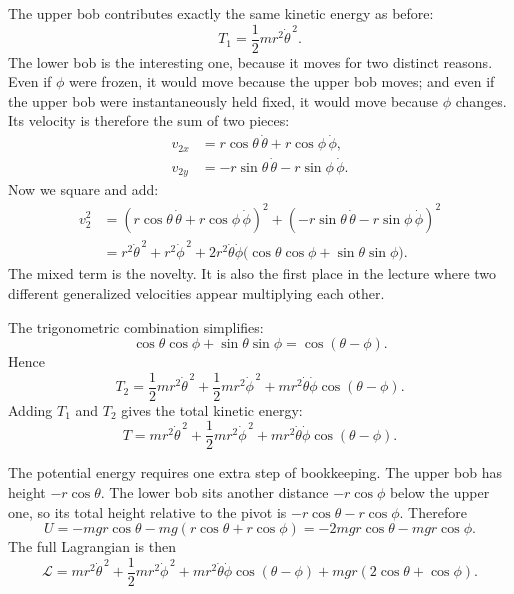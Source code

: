 The upper bob contributes exactly the same kinetic energy as before:
\begin{equation}
T_1=\frac12 mr^2\dot\theta^{\,2}.
\end{equation}
The lower bob is the interesting one, because it moves for two distinct reasons. Even if \(\phi\) were frozen, it would move because the upper bob moves; and even if the upper bob were instantaneously held fixed, it would move because \(\phi\) changes. Its velocity is therefore the sum of two pieces:
\begin{align}
v_{2x} &= r\cos\theta\,\dot\theta+r\cos\phi\,\dot\phi,\\
v_{2y} &= -r\sin\theta\,\dot\theta-r\sin\phi\,\dot\phi.
\end{align}
Now we square and add:
\begin{align}
v_2^2
&=
\left(r\cos\theta\,\dot\theta+r\cos\phi\,\dot\phi\right)^2
+
\left(-r\sin\theta\,\dot\theta-r\sin\phi\,\dot\phi\right)^2\\
&=
r^2\dot\theta^{\,2}
+
r^2\dot\phi^{\,2}
+
2r^2\dot\theta\dot\phi
\bigl(\cos\theta\cos\phi+\sin\theta\sin\phi\bigr).
\end{align}
The mixed term is the novelty. It is also the first place in the lecture where two different generalized velocities appear multiplying each other.

The trigonometric combination simplifies:
\begin{equation}
\cos\theta\cos\phi+\sin\theta\sin\phi=\cos(\theta-\phi).
\end{equation}
Hence
\begin{equation}
T_2
=
\frac12 mr^2\dot\theta^{\,2}
+
\frac12 mr^2\dot\phi^{\,2}
+
mr^2\dot\theta\dot\phi\cos(\theta-\phi).
\end{equation}
Adding \(T_1\) and \(T_2\) gives the total kinetic energy:
\begin{equation}
T
=
mr^2\dot\theta^{\,2}
+
\frac12 mr^2\dot\phi^{\,2}
+
mr^2\dot\theta\dot\phi\cos(\theta-\phi).
\end{equation}

The potential energy requires one extra step of bookkeeping. The upper bob has height \(-r\cos\theta\). The lower bob sits another distance \(-r\cos\phi\) below the upper one, so its total height relative to the pivot is \(-r\cos\theta-r\cos\phi\). Therefore
\begin{equation}
U
=
-mgr\cos\theta
-
mg(r\cos\theta+r\cos\phi)
=
-2mgr\cos\theta-mgr\cos\phi.
\end{equation}
The full Lagrangian is then
\begin{equation}
\mathcal{L}
=
mr^2\dot\theta^{\,2}
+
\frac12 mr^2\dot\phi^{\,2}
+
mr^2\dot\theta\dot\phi\cos(\theta-\phi)
+
mgr(2\cos\theta+\cos\phi).
\end{equation}

